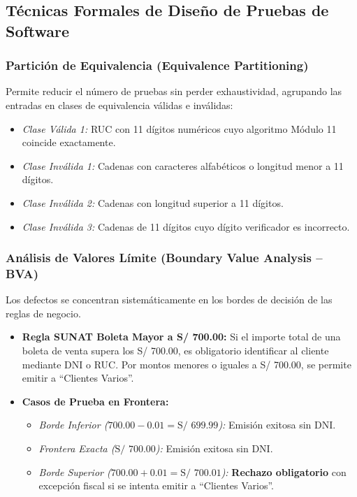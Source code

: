 \documentclass[11pt,a4paper]{article}
\begin{document}
\subsection{Técnicas Formales de Diseño de Pruebas de Software}

\subsubsection{Partición de Equivalencia (Equivalence Partitioning)}
Permite reducir el número de pruebas sin perder exhaustividad, agrupando las entradas en clases de equivalencia válidas e inválidas:
\begin{itemize}[noitemsep]
    \item \textit{Clase Válida 1:} RUC con 11 dígitos numéricos cuyo algoritmo Módulo 11 coincide exactamente.
    \item \textit{Clase Inválida 1:} Cadenas con caracteres alfabéticos o longitud menor a 11 dígitos.
    \item \textit{Clase Inválida 2:} Cadenas con longitud superior a 11 dígitos.
    \item \textit{Clase Inválida 3:} Cadenas de 11 dígitos cuyo dígito verificador es incorrecto.
\end{itemize}

\subsubsection{Análisis de Valores Límite (Boundary Value Analysis -- BVA)}
Los defectos se concentran sistemáticamente en los bordes de decisión de las reglas de negocio.
\begin{itemize}[noitemsep]
    \item \textbf{Regla SUNAT Boleta Mayor a S/ 700.00:} Si el importe total de una boleta de venta supera los S/ 700.00, es obligatorio identificar al cliente mediante DNI o RUC. Por montos menores o iguales a S/ 700.00, se permite emitir a ``Clientes Varios''.
    \item \textbf{Casos de Prueba en Frontera:}
    \begin{itemize}[noitemsep]
        \item \textit{Borde Inferior ($700.00 - 0.01 = \text{S/ } 699.99$):} Emisión exitosa sin DNI.
        \item \textit{Frontera Exacta ($\text{S/ } 700.00$):} Emisión exitosa sin DNI.
        \item \textit{Borde Superior ($700.00 + 0.01 = \text{S/ } 700.01$):} \textbf{Rechazo obligatorio} con excepción fiscal si se intenta emitir a ``Clientes Varios''.
    \end{itemize}
\end{itemize}
\end{document}
